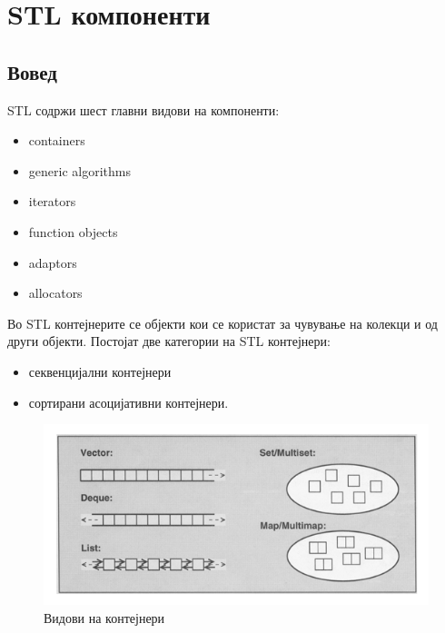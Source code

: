 


\lfoot{}
\cfoot{\thepage}
\rfoot{}
\usepackage{fancyvrb}
\usepackage{xcolor}
\usepackage{textcomp}



\section{STL компоненти}

\subsection{Вовед}

STL содржи шест главни видови на компоненти:

\begin{itemize}
  \item containers
  \item generic algorithms
  \item iterators
  \item function objects
  \item adaptors
  \item allocators
\end{itemize}

Во STL контејнерите се објекти кои се користат за чувување на колекци и од други
објекти. 
Постојат две категории на STL контејнери: 
\begin{itemize}
  \item секвенцијални контејнери
  \item сортирани асоцијативни контејнери. 
\end{itemize}

\begin{figure}[htb]
\centering
\includegraphics[scale=.5]{images/container_types}
\caption{Видови на контејнери}
\label{fig:container_types}
\end{figure}

